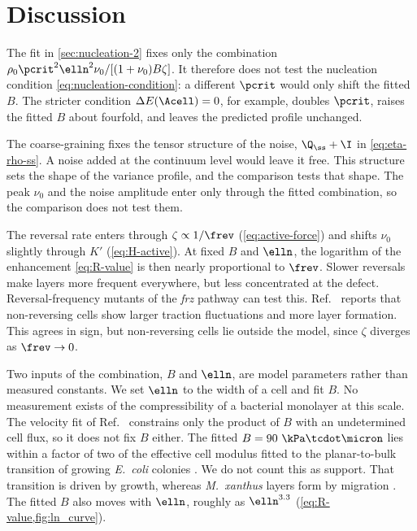 
\section{Discussion}
\label{sec:discussion}
The fit in \cref{sec:nucleation-2} fixes only the combination
$\rho_0\pcrit^2\elln^2\nu_0/[(1+\nu_0)B\zeta]$. It therefore does not test the nucleation
condition \cref{eq:nucleation-condition}: a different $\pcrit$ would only shift the
fitted $B$. The stricter condition $\Delta E(\Acell)=0$, for example, doubles $\pcrit$,
raises the fitted $B$ about fourfold, and leaves the predicted profile unchanged.

The coarse-graining fixes the tensor structure of the noise, $\Q_\ss+\I$ in
\cref{eq:eta-rho-ss}. A noise added at the continuum level would leave it free. This
structure sets the shape of the variance profile, and the comparison tests that shape.
The peak $\nu_0$ and the noise amplitude enter only through the fitted combination, so
the comparison does not test them.

The reversal rate enters through $\zeta\propto1/\frev$ (\cref{eq:active-force}) and
shifts $\nu_0$ slightly through $K'$ (\cref{eq:H-active}). At fixed $B$ and $\elln$, the
logarithm of the enhancement \cref{eq:R-value} is then nearly proportional to $\frev$.
Slower reversals make layers more frequent everywhere, but less concentrated at the
defect. Reversal-frequency mutants of the \textit{frz} pathway can test this.
Ref.~\cite{han2025local} reports that non-reversing cells show larger traction
fluctuations and more layer formation. This agrees in sign, but non-reversing cells lie
outside the model, since $\zeta$ diverges as $\frev\to0$.

Two inputs of the combination, $B$ and $\elln$, are model parameters rather than
measured constants. We set $\elln$ to the width of a cell and fit $B$. No measurement
exists of the compressibility of a bacterial monolayer at this scale. The velocity fit
of Ref.~\cite{copenhagen2021} constrains only the product of $B$ with an undetermined cell
flux, so it does not fix $B$ either. The fitted $B=90~\kPa\tcdot\micron$ lies
within a factor of two of the effective cell modulus fitted to the planar-to-bulk transition of growing
\textit{E.\ coli} colonies \cite{grant2014}. We do not count this as support. That
transition is driven by growth, whereas \textit{M.\ xanthus} layers form by migration
\cite{copenhagen2021}. The fitted $B$ also moves with $\elln$, roughly as $\elln^{3.3}$
(\cref{eq:R-value,fig:ln_curve}).

